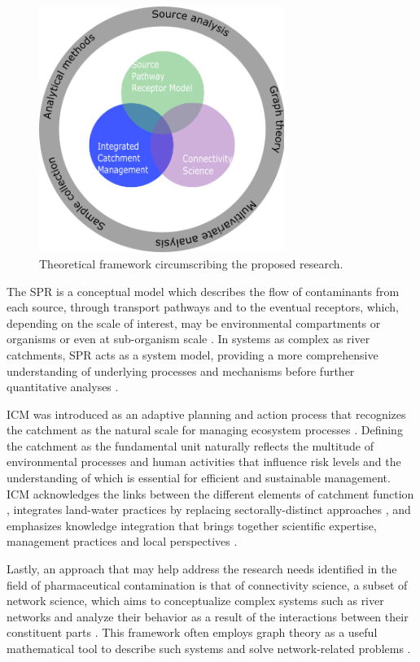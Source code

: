 \documentclass{article}
\begin{document}
\begin{figure}[h]
    \centering
    \includegraphics[height=8cm]{fig_framework.png}
    \caption{Theoretical framework circumscribing the proposed research.}
    \label{fig_framework}
\end{figure}

The SPR is a conceptual model which describes the flow of contaminants from each source, through transport pathways  and to the eventual receptors, which, depending on the scale of interest, may be environmental compartments or organisms or even at sub-organism scale \citep{Holdgate1979APollution.}. In systems as complex as river catchments, SPR acts as a system model, providing a more comprehensive understanding of underlying processes and mechanisms before further quantitative analyses \citep{Narayan2012SystemConcept,Waldschlager2020Thereview}. 

ICM was introduced as an adaptive planning and action process that recognizes the catchment as the natural scale for managing ecosystem processes \citep{Fenemor2011IntegratedKnowledge}. Defining the catchment as the fundamental unit naturally reflects the multitude of environmental processes and human activities that influence risk levels and the understanding of which is essential for efficient and sustainable management. ICM acknowledges the links between the different elements of catchment function \citep{Collins2010TrustingWales}, integrates land-water practices by replacing sectorally-distinct approaches \citep{Rollason2015Multi-DimensionalOf}, and emphasizes knowledge integration that brings together scientific expertise, management practices and local perspectives \citep{Rollason2018EvaluatingManagement}.

Lastly, an approach that may help address the research needs identified in the field of pharmaceutical contamination is that of connectivity science, a subset of network science, which aims to conceptualize complex systems such as river networks and analyze their behavior as a result of the interactions between their constituent parts \citep{Bullmore2009ComplexSystems}. This framework often employs graph theory as a useful mathematical tool to describe such systems and solve network-related problems \citep{Anderson2020ComplexApplications,Phillips2015GraphGeosciences}. 
\end{document}
